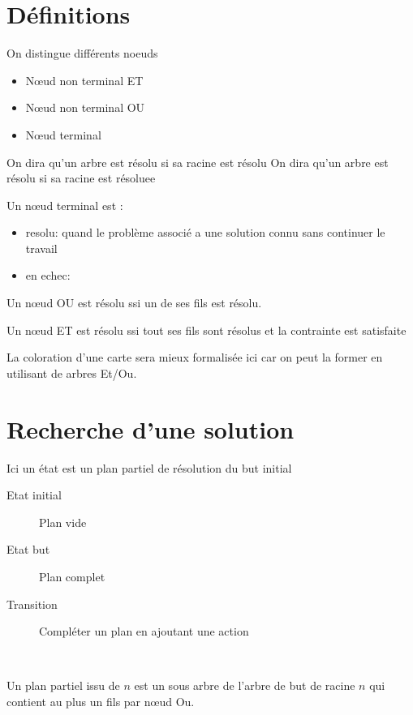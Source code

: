 \documentclass[12pt,a4paper,openany]{book}
\begin{document}
	\section{Définitions}
	On distingue différents noeuds 
	\begin{itemize}
		\item Nœud non terminal ET
		\item Nœud non terminal OU
		\item Nœud terminal
	\end{itemize}
	On dira qu'un arbre est résolu si sa racine est résolu	On dira qu'un arbre est résolu si sa racine est résoluee

	\begin{definition}
		Un nœud terminal est :

		\begin{itemize}
			\item resolu: quand le problème associé a une solution connu sans continuer le travail
			\item en echec: 
		\end{itemize}
	\end{definition}


	\begin{definition}
		Un nœud OU est résolu ssi un de ses fils est résolu.
	\end{definition}

	\begin{definition}
		Un nœud ET est résolu ssi tout ses fils sont résolus et la contrainte est satisfaite
	\end{definition}

	\begin{remarque}
	La coloration d'une carte sera mieux formalisée ici car on peut la former en utilisant de arbres Et/Ou.
		\end{remarque}

	\section{Recherche d'une solution}
	Ici un état est un plan partiel de résolution du but initial
	\begin{description}
		\item[Etat initial]Plan vide
		\item[Etat but] Plan complet
		\item[Transition] Compléter un plan en ajoutant une action 
	\end{description}
	
~
	\begin{definition}
		Un plan partiel issu de $n$ est un sous arbre de l'arbre de but de racine $n$ qui contient au plus un fils par nœud Ou.
	\end{definition}
\end{document}
